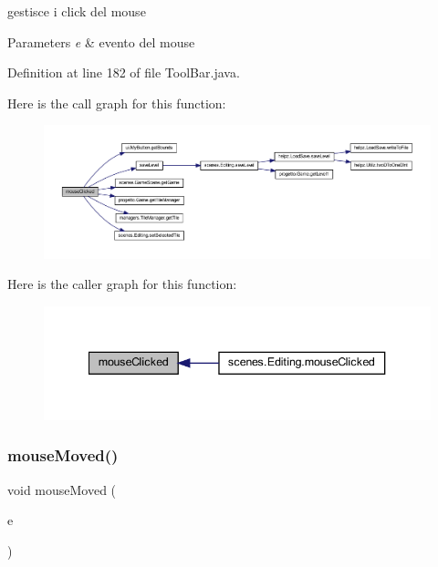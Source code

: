 gestisce i click del mouse 


\begin{DoxyParams}{Parameters}
{\em e} & evento del mouse \\
\hline
\end{DoxyParams}


Definition at line 182 of file Tool\+Bar.\+java.

Here is the call graph for this function\+:\nopagebreak
\begin{figure}[H]
\begin{center}
\leavevmode
\includegraphics[width=350pt]{classui_1_1_tool_bar_a45d56bd84238e8b56589dfc732e2b2cf_cgraph}
\end{center}
\end{figure}
Here is the caller graph for this function\+:\nopagebreak
\begin{figure}[H]
\begin{center}
\leavevmode
\includegraphics[width=340pt]{classui_1_1_tool_bar_a45d56bd84238e8b56589dfc732e2b2cf_icgraph}
\end{center}
\end{figure}
\mbox{\label{classui_1_1_tool_bar_a2ca251710b65639ec80bc141edde60aa}} 
\subsubsection{\texorpdfstring{mouse\+Moved()}{mouseMoved()}}
{\footnotesize\ttfamily void mouse\+Moved (\begin{DoxyParamCaption}\item[{Mouse\+Event}]{e }\end{DoxyParamCaption})}




